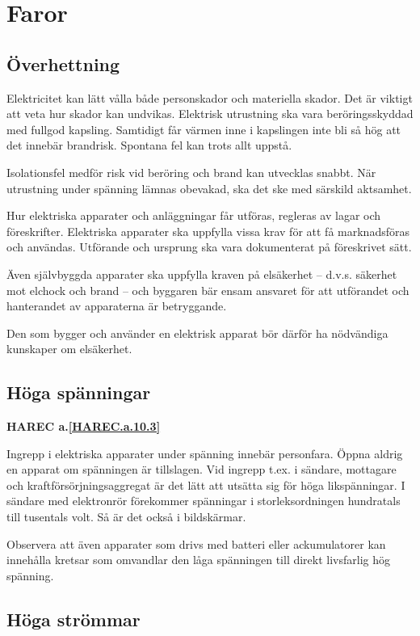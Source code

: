 \section{Faror}

\subsection{Överhettning}

Elektricitet kan lätt vålla både personskador och materiella skador.
Det är viktigt att veta hur skador kan undvikas.
Elektrisk utrustning ska vara beröringsskyddad med fullgod kapsling.
Samtidigt får värmen inne i kapslingen inte bli så hög att det innebär
brandrisk.
Spontana fel kan trots allt uppstå.

Isolationsfel medför risk vid beröring och brand kan utvecklas snabbt.
När utrustning under spänning lämnas obevakad, ska det ske med särskild
aktsamhet.

Hur elektriska apparater och anläggningar får utföras, regleras av
lagar och föreskrifter.
Elektriska apparater ska uppfylla vissa krav för att få marknadsföras och
användas.
Utförande och ursprung ska vara dokumenterat på föreskrivet sätt.

Även självbyggda apparater ska uppfylla kraven på elsäkerhet -- d.v.s. säkerhet
mot elchock och brand -- och byggaren bär ensam ansvaret för att utförandet och
hanterandet av apparaterna är betryggande.

Den som bygger och använder en elektrisk apparat bör därför ha
nödvändiga kunskaper om elsäkerhet.

\subsection{Höga spänningar}
\textbf{
HAREC a.\ref{HAREC.a.10.3}\label{myHAREC.a.10.3}
}

Ingrepp i elektriska apparater under spänning innebär personfara.
Öppna aldrig en apparat om spänningen är tillslagen.
Vid ingrepp t.ex. i sändare, mottagare och kraftförsörjningsaggregat är
det lätt att utsätta sig för höga likspänningar.
I sändare med elektronrör förekommer spänningar i storleksordningen hundratals
till tusentals volt.
Så är det också i bildskärmar.

Observera att även apparater som drivs med batteri eller ackumulatorer kan
innehålla kretsar som omvandlar den låga spänningen till direkt livsfarlig hög
spänning.

\subsection{Höga strömmar}

